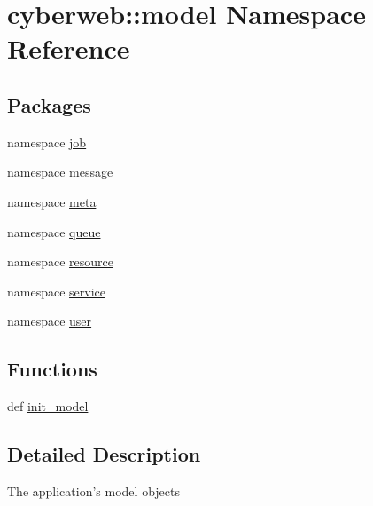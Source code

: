 \hypertarget{namespacecyberweb_1_1model}{\section{cyberweb\-:\-:model \-Namespace \-Reference}
\label{namespacecyberweb_1_1model}
}
\subsection*{\-Packages}
\begin{DoxyCompactItemize}
\item 
namespace \hyperlink{namespacecyberweb_1_1model_1_1job}{job}
\item 
namespace \hyperlink{namespacecyberweb_1_1model_1_1message}{message}
\item 
namespace \hyperlink{namespacecyberweb_1_1model_1_1meta}{meta}
\item 
namespace \hyperlink{namespacecyberweb_1_1model_1_1queue}{queue}
\item 
namespace \hyperlink{namespacecyberweb_1_1model_1_1resource}{resource}
\item 
namespace \hyperlink{namespacecyberweb_1_1model_1_1service}{service}
\item 
namespace \hyperlink{namespacecyberweb_1_1model_1_1user}{user}
\end{DoxyCompactItemize}
\subsection*{\-Functions}
\begin{DoxyCompactItemize}
\item 
def \hyperlink{namespacecyberweb_1_1model_af4470bae5d0ad2b2006857acfa3d2757}{init\-\_\-model}
\end{DoxyCompactItemize}


\subsection{\-Detailed \-Description}
\begin{DoxyVerb}The application's model objects\end{DoxyVerb}
 

